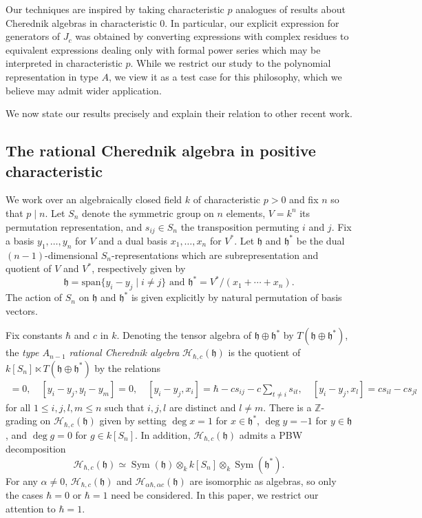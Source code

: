 \documentclass{amsart}
\numberwithin{equation}{section}
\theoremstyle{definition}
\newcommand{\ZZ}{\mathbb{Z}}
\newcommand{\h}{\mathfrak{h}}
\newcommand{\HH}{\mathcal{H}}
\newcommand{\Sym}{\operatorname{Sym}}
\newcommand{\sspan}{\text{span}}
\begin{document}
Our techniques are inspired by taking characteristic $p$ analogues of results about Cherednik algebras in characteristic $0$.  In particular, our explicit expression for generators of $J_c$ was obtained by converting expressions with complex residues to equivalent expressions dealing only with formal power series which may be interpreted in characteristic $p$.  While we restrict our study to the polynomial representation in type $A$, we view it as a test case for this philosophy, which we believe may admit wider application.

We now state our results precisely and explain their relation to other recent work.

\subsection{The rational Cherednik algebra in positive characteristic}

We work over an algebraically closed field $k$ of characteristic $p > 0$ and fix $n$ so that $p \mid n$.  Let $S_n$ denote the symmetric group on $n$ elements, $V = k^n$ its permutation representation, and $s_{ij} \in S_n$ the transposition permuting $i$ and $j$.  Fix a basis $y_1,\ldots,y_{n}$ for $V$ and a dual basis $x_1, \ldots, x_{n}$ for $V^*$.  Let $\h$ and $\h^*$ be the dual $(n - 1)$-dimensional $S_n$-representations which are subrepresentation and quotient of $V$ and $V^*$, respectively given by
\[
\h = \sspan\{y_i - y_j \mid i \neq j\} \text{ and } \h^* = V^*/(x_1 + \cdots + x_{n}).
\]
The action of $S_n$ on $\h$ and $\h^*$ is given explicitly by natural permutation of basis vectors.

Fix constants $\hbar$ and $c$ in $k$.  Denoting the tensor algebra of $\h \oplus \h^*$ by $T(\h \oplus \h^*)$, the \textit{type $A_{n - 1}$ rational Cherednik algebra} $\HH_{\hbar, c}(\h)$ is the quotient of $k[S_n] \ltimes T(\h \oplus \h^*)$ by the relations
\begin{align*}
[x_i,x_j]=0, \quad [y_i-y_j,y_l-y_m] = 0, \quad [y_i-y_j,x_i] = \hbar- cs_{ij}-c \sum_{t \ne i} s_{it},\quad [y_i-y_j,x_l] =cs_{il}-cs_{jl}\end{align*}
for all $1 \le i , j, l, m \le n$ such that $i,j,l$ are distinct and $l \neq m$. There is a $\ZZ$-grading on $\HH_{\hbar,c}(\h)$ given by setting $\deg x=1$ for $x \in \h^*$, $\deg y = -1$ for $y \in \h$, and $\deg g=0$ for $g \in k[S_n]$.  In addition, $\HH_{\hbar, c}(\h)$ admits a PBW decomposition 
\[
\HH_{\hbar,c}(\h) \simeq \Sym(\h) \otimes_k k[S_n] \otimes_k \Sym(\h^*).
\]
For any $\alpha \ne 0$, $\HH_{\hbar,c}(\h)$ and $\HH_{\alpha\hbar,\alpha c}(\h)$ are isomorphic as algebras, so only the cases $\hbar = 0$ or $\hbar = 1$ need be considered.  In this paper, we restrict our attention to $\hbar = 1$.
\end{document}
